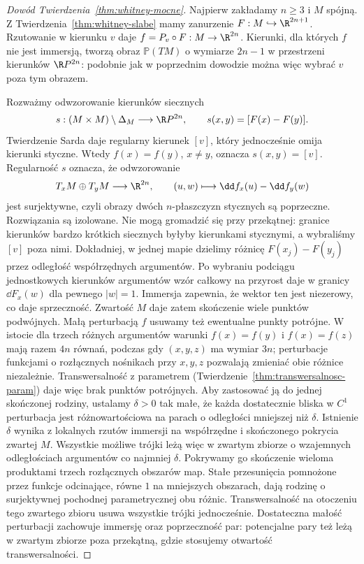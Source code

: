 \begin{proof}[Dowód Twierdzenia~\ref{thm:whitney-mocne}]
Najpierw zakładamy $n\geq3$ i $M$ spójną.
Z Twierdzenia~\ref{thm:whitney-slabe}
mamy zanurzenie $F:M\hookrightarrow\R^{2n+1}$.
Rzutowanie w kierunku $v$ daje
$f=P_v\circ F:M\to\R^{2n}$. Kierunki,
dla których $f$ nie jest immersją,
tworzą obraz $\mathbb P(TM)$ o wymiarze
$2n-1$ w przestrzeni kierunków
$\R P^{2n}$: podobnie jak w poprzednim
dowodzie można więc wybrać $v$ poza
tym obrazem.

Rozważmy odwzorowanie kierunków siecznych
\[
 s:(M\times M)\setminus\Delta_M
   \longrightarrow\R P^{2n},\qquad
 s(x,y)=[F(x)-F(y)].
\]
Twierdzenie Sarda daje regularny kierunek
$[v]$, który jednocześnie omija
kierunki styczne. Wtedy
$f(x)=f(y)$, $x\ne y$, oznacza
$s(x,y)=[v]$. Regularność $s$
oznacza, że odwzorowanie
\[
 T_xM\oplus T_yM\longrightarrow\R^{2n},
 \qquad (u,w)\longmapsto
   \dd f_x(u)-\dd f_y(w)
\]
jest surjektywne, czyli obrazy dwóch
$n$-płaszczyzn stycznych są poprzeczne.
Rozwiązania są izolowane. Nie mogą
gromadzić się przy przekątnej:
granice kierunków bardzo krótkich
siecznych byłyby kierunkami stycznymi,
a wybraliśmy $[v]$ poza nimi. Dokładniej, w jednej
mapie dzielimy różnicę $F(x_j)-F(y_j)$ przez
odległość współrzędnych argumentów. Po wybraniu
podciągu jednostkowych kierunków argumentów wzór
całkowy na przyrost daje w granicy $\dd F_x(w)$
dla pewnego $|w|=1$. Immersja zapewnia, że wektor
ten jest niezerowy, co daje sprzeczność.
Zwartość $M$ daje zatem skończenie
wiele punktów podwójnych.
Małą perturbacją $f$ usuwamy też
ewentualne punkty potrójne.
W istocie dla trzech różnych argumentów
warunki $f(x)=f(y)$ i $f(x)=f(z)$
mają razem $4n$ równań, podczas gdy
$(x,y,z)$ ma wymiar $3n$; perturbacje
funkcjami o rozłącznych nośnikach
przy $x,y,z$ pozwalają zmieniać
obie różnice niezależnie.
Transwersalność z parametrem
(Twierdzenie~\ref{thm:transwersalnosc-param})
daje więc brak punktów potrójnych. Aby zastosować
ją do jednej skończonej rodziny, ustalamy
$\delta>0$ tak małe, że każda dostatecznie bliska
w $C^1$ perturbacja jest różnowartościowa na parach
o odległości mniejszej niż $\delta$. Istnienie
$\delta$ wynika z lokalnych rzutów immersji na
współrzędne i skończonego pokrycia zwartej $M$.
Wszystkie możliwe trójki leżą więc w zwartym zbiorze
o wzajemnych odległościach argumentów co najmniej
$\delta$. Pokrywamy go skończenie wieloma produktami
trzech rozłącznych obszarów map. Stałe przesunięcia
pomnożone przez funkcje odcinające, równe $1$ na
mniejszych obszarach, dają rodzinę o surjektywnej
pochodnej parametrycznej obu różnic. Transwersalność
na otoczeniu tego zwartego zbioru usuwa wszystkie
trójki jednocześnie. Dostateczna małość perturbacji
zachowuje immersję oraz poprzeczność par: potencjalne
pary też leżą w zwartym zbiorze poza przekątną,
gdzie stosujemy otwartość transwersalności.


\end{proof}
